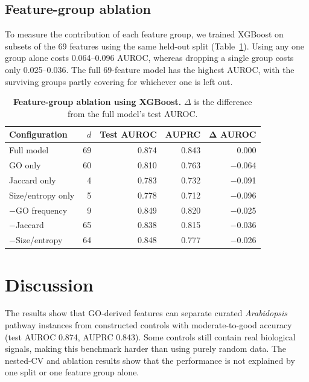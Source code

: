 \documentclass[12pt,letterpaper,oneside,openany]{book}
\begin{document}
\section{Feature-group ablation}
\label{sec:res_ablation}

To measure the contribution of each feature group, we trained XGBoost on subsets of the 69 features using the same held-out split (Table~\ref{tab:s3_ablation}). Using any one group alone costs 0.064--0.096 AUROC, whereas dropping a single group costs only 0.025--0.036. The full 69-feature model has the highest AUROC, with the surviving groups partly covering for whichever one is left out.

\begin{table}[H]
\centering
\caption{\textbf{Feature-group ablation using XGBoost.}
$\Delta$ is the difference from the full model's test AUROC.}
\label{tab:s3_ablation}
\renewcommand{\arraystretch}{1.18}
\setlength{\tabcolsep}{7pt}
\begin{tabular}{lrrrr}
\toprule
\textbf{Configuration} & $d$ & \textbf{Test AUROC} & \textbf{AUPRC} & $\boldsymbol{\Delta}$ AUROC \\
\midrule
Full model & 69 & 0.874 & 0.843 & 0.000 \\
GO only & 60 & 0.810 & 0.763 & $-$0.064 \\
Jaccard only & 4 & 0.783 & 0.732 & $-$0.091 \\
Size/entropy only & 5 & 0.778 & 0.712 & $-$0.096 \\
$-$GO frequency & 9 & 0.849 & 0.820 & $-$0.025 \\
$-$Jaccard & 65 & 0.838 & 0.815 & $-$0.036 \\
$-$Size/entropy & 64 & 0.848 & 0.777 & $-$0.026 \\
\bottomrule
\end{tabular}
\end{table}


\chapter{Discussion}
\label{sec:discussion}

The results show that GO-derived features can separate curated \textit{Arabidopsis} pathway instances from constructed controls with moderate-to-good accuracy (test AUROC 0.874, AUPRC 0.843). Some controls still contain real biological signals, making this benchmark harder than using purely random data. The nested-CV and ablation results show that the performance is not explained by one split or one feature group alone.
\end{document}
